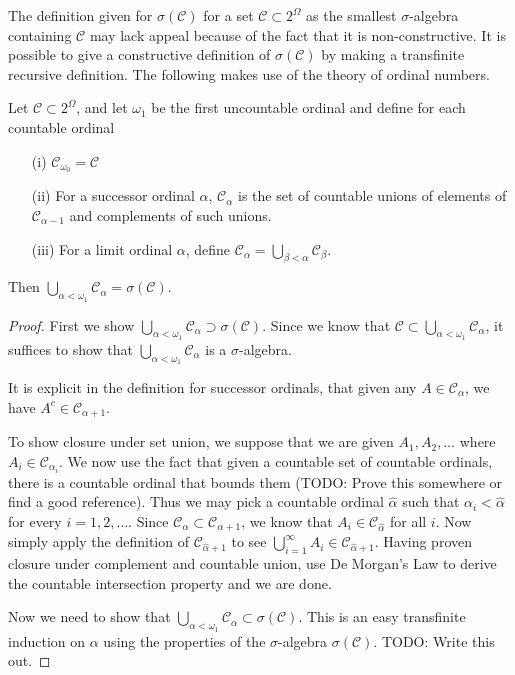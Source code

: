 The definition given for $\sigma(\mathcal{C})$ for a set $\mathcal{C}
\subset 2^\Omega$ as the smallest $\sigma$-algebra containing
$\mathcal{C}$ may lack appeal because of the fact that it is
non-constructive.  It is possible to give a constructive definition of
$\sigma(\mathcal{C})$ by making a transfinite recursive definition.
The following makes use of the theory of ordinal numbers.
\begin{lem}Let $\mathcal{C} \subset 2^\Omega$, and let $\omega_1$ be
  the first uncountable ordinal and define for each countable ordinal
\begin{itemize}
\item[(i)]$\mathcal{C}_{\omega_0} = \mathcal{C}$
\item[(ii)]For a successor ordinal $\alpha$, $\mathcal{C}_\alpha$ is
  the set of countable unions of elements of $\mathcal{C}_{\alpha -
    1}$ and complements of such unions.
\item[(iii)]For a limit ordinal $\alpha$, define $\mathcal{C}_\alpha =
  \bigcup_{\beta < \alpha} \mathcal{C}_\beta$.
\end{itemize}
Then $\bigcup_{\alpha < \omega_1} \mathcal{C}_\alpha = \sigma(\mathcal{C})$.
\end{lem}
\begin{proof}
First we show $\bigcup_{\alpha < \omega_1} \mathcal{C}_\alpha \supset
\sigma(\mathcal{C})$.  Since we know that $\mathcal{C} \subset
\bigcup_{\alpha < \omega_1} \mathcal{C}_\alpha$, it suffices to show
that $\bigcup_{\alpha < \omega_1} \mathcal{C}_\alpha$ is a
$\sigma$-algebra.

It is explicit in the definition for successor
ordinals, that given any $A \in \mathcal{C}_\alpha$, we have $A^c \in  \mathcal{C}_{\alpha+1}$.

To show closure under set union, we suppose that we are
given $A_1, A_2, \dots$ where $A_i \in \mathcal{C}_{\alpha_i}$.  We now
use the fact that given a countable set of countable ordinals, there
is a countable ordinal that bounds them (TODO: Prove this somewhere or
find a good reference).  Thus we may pick a countable ordinal $\hat
\alpha$ such that $\alpha_i < \hat {\alpha}$ for every $i=1,2,\dots$.  Since
$\mathcal{C}_\alpha \subset \mathcal{C}_{\alpha+1}$, we know that $A_i
\in \mathcal{C}_{\hat \alpha}$ for all $i$.  Now simply apply the definition
of $\mathcal{C}_{\hat \alpha + 1}$ to see
$\bigcup_{i=1}^\infty A_i \in \mathcal{C}_{\hat \alpha + 1}$.  Having
proven closure under complement and countable union, use De
Morgan's Law to derive the countable intersection property and we are done.

Now we need to show that $\bigcup_{\alpha < \omega_1} \mathcal{C}_\alpha \subset
\sigma(\mathcal{C})$.  This is an easy transfinite induction on
$\alpha$ using the properties of the $\sigma$-algebra
$\sigma(\mathcal{C})$.
TODO: Write this out.
\end{proof}

